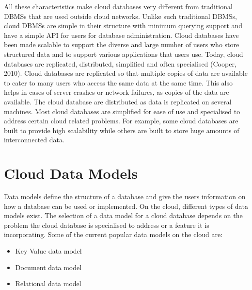 All these characteristics make cloud databases very
different from traditional \acp{DBMS} that are used outside cloud networks.
Unlike such traditional \acp{DBMS}, cloud \acp{DBMS} are simple in their structure with minimum querying support and have a
simple API for users for database administration. Cloud databases have been made
scalable to support the diverse and large number of users who store structured data and to support
various applications that users use. Today, cloud databases are replicated,
distributed, simplified and often specialised (Cooper, 2010). Cloud databases
are replicated so that multiple copies of data are available to cater to many
users who access the same data at the same time. This also helps in cases of
server crashes or network failures, as copies of the data are available. The
cloud database are distributed as data is replicated on several machines. Most
cloud databases are simplified for ease of use and specialised to address
certain cloud related problems. For example, some cloud databases are built to provide high 
scalability while others are built to store huge amounts of interconnected data.

\section{Cloud Data Models}\label{s:cloud-data-models}
Data models define the structure of a database and give the users information on
how a database can be used or implemented. On the cloud, different types of data
models exist. The selection of a data model for a cloud database depends
on the problem the cloud database is specialised to address or a feature it is
incorporating. Some of the current popular data models on the cloud are:

\begin{itemize}
\item Key Value data model 

\item Document data model 

\item Relational data model
\end{itemize}

